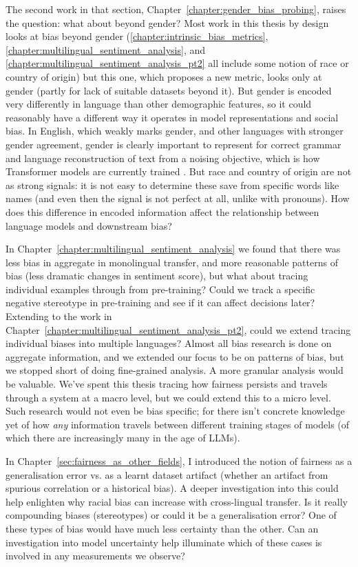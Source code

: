 The second work in that section, Chapter~\ref{chapter:gender_bias_probing}, raises the question: what about beyond gender? Most work in this thesis by design looks at bias beyond gender (\ref{chapter:intrinsic_bias_metrics}, \ref{chapter:multilingual_sentiment_analysis}, and \ref{chapter:multilingual_sentiment_analysis_pt2} all include some notion of race or country of origin) but this one,  which proposes a new metric, looks only at gender (partly for lack of suitable datasets beyond it). But gender is encoded very differently in language than other demographic features, so it could reasonably have a different way it operates in model representations and social bias. In English, which weakly marks gender, and other languages with stronger gender agreement, gender is clearly important to represent for correct grammar and language reconstruction of text from a noising objective, which is how Transformer models are currently trained  \citep{liu2019roberta, lewis-etal-2020-bart, vaswani}. But race and country of origin are not as strong signals: it is not easy to determine these save from specific words like names (and even then the signal is not perfect at all, unlike with pronouns). How does this difference in encoded information affect the relationship between language models and downstream bias?

In Chapter~\ref{chapter:multilingual_sentiment_analysis} we found that there was less bias in aggregate in monolingual transfer, and more reasonable patterns of bias (less dramatic changes in sentiment score), but what about tracing individual examples through from pre-training? Could we track a specific negative stereotype in pre-training and see if it can affect decisions later? Extending to the work in Chapter~\ref{chapter:multilingual_sentiment_analysis_pt2}, could we extend tracing individual biases into multiple languages? Almost all bias research is done on aggregate information, and we extended our focus to be on patterns of bias, but we stopped short of doing fine-grained analysis. A more granular analysis would be valuable. We've spent this thesis tracing how fairness persists and travels through a system at a macro level, but we could extend this to a micro level. Such research would not even be bias specific; for there isn't concrete knowledge yet of how \textit{any} information travels between different training stages of models (of which there are increasingly many in the age of LLMs).

In Chapter~\ref{sec:fairness_as_other_fields}, I introduced the notion of fairness as a generalisation error vs. as a learnt dataset artifact (whether an artifact from spurious correlation or a historical bias). A deeper investigation into this could help enlighten why racial bias can increase with cross-lingual transfer. Is it really compounding biases (stereotypes) or could it be a generalisation error? One of these types of bias would have much less certainty than the other. Can an investigation into model uncertainty help illuminate which of these cases is involved in any measurements we observe?

